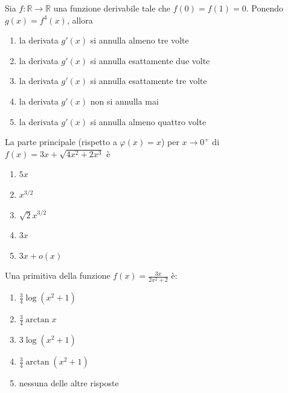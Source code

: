 \begin{quiz}
Sia $f:\mathbb R\to\mathbb R$ una funzione derivabile tale che $f(0)=f(1)=0$. Ponendo $g(x)=f^4(x)$, allora
\begin{enumerate}
\item la derivata $g\prime(x)$ si annulla almeno tre volte
\item la derivata $g\prime(x)$ si annulla esattamente due volte
\item la derivata $g\prime(x)$ si annulla esattamente tre volte
\item la derivata $g\prime(x)$ non si annulla mai
\item la derivata $g\prime(x)$ si annulla almeno quattro volte
\end{enumerate}
\end{quiz}

\begin{quiz}
La parte principale (rispetto a $\varphi(x)=x$) per $x\to0^+$ di $f(x)=3x+\sqrt{4x^2+2x^3}$ \`e
\begin{enumerate}
\item $5x$
\item $x^{3/2}$
\item $\sqrt2x^{3/2}$
\item $3x$
\item $3x+o(x)$
\end{enumerate}
\end{quiz}

\begin{quiz}
Una primitiva della funzione $f(x)=\frac{3x}{2x^2+2}$ \`e:
\begin{enumerate}
\item $\frac34\log(x^2+1)$
\item $\frac34\arctan x$
\item $3\log(x^2+1)$
\item $\frac34\arctan(x^2+1)$
\item nessuna delle altre risposte
\end{enumerate}
\end{quiz}

